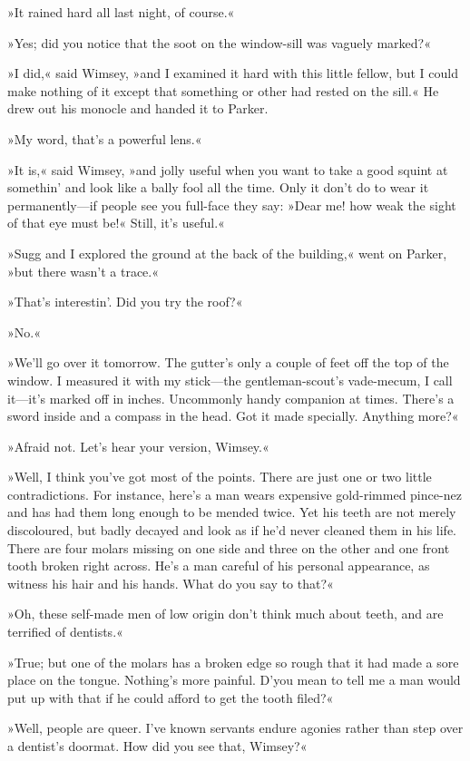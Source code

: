 »It rained hard all last night, of course.«

»Yes; did you notice that the soot on the window-sill was vaguely marked?«

»I did,« said Wimsey, »and I examined it hard with this little fellow, but I could make nothing of it except that something or other had rested on the sill.« He drew out his monocle and handed it to Parker.

»My word, that's a powerful lens.«

»It is,« said Wimsey, »and jolly useful when you want to take a good squint at somethin' and look like a bally fool all the time. Only it don't do to wear it permanently—if people see you full-face they say: »Dear me! how weak the sight of that eye must be!« Still, it's useful.«

»Sugg and I explored the ground at the back of the building,« went on Parker, »but there wasn't a trace.«

»That's interestin'. Did you try the roof?«

»No.«

»We'll go over it tomorrow. The gutter's only a couple of feet off the top of the window. I measured it with my stick—the gentleman-scout's vade-mecum, I call it—it's marked off in inches. Uncommonly handy companion at times. There's a sword inside and a compass in the head. Got it made specially. Anything more?«

»Afraid not. Let's hear your version, Wimsey.«

»Well, I think you've got most of the points. There are just one or two little contradictions. For instance, here's a man wears expensive gold-rimmed pince-nez and has had them long enough to be mended twice. Yet his teeth are not merely discoloured, but badly decayed and look as if he'd never cleaned them in his life. There are four molars missing on one side and three on the other and one front tooth broken right across. He's a man careful of his personal appearance, as witness his hair and his hands. What do you say to that?«

»Oh, these self-made men of low origin don't think much about teeth, and are terrified of dentists.«

»True; but one of the molars has a broken edge so rough that it had made a sore place on the tongue. Nothing's more painful. D'you mean to tell me a man would put up with that if he could afford to get the tooth filed?«

»Well, people are queer. I've known servants endure agonies rather than step over a dentist's doormat. How did you see that, Wimsey?«

